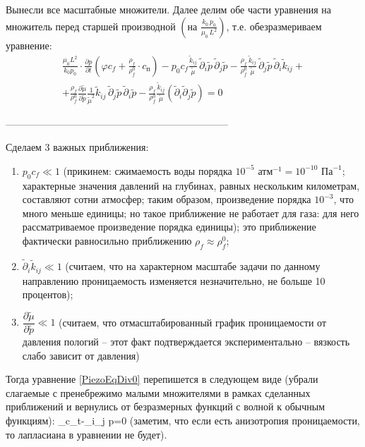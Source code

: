 Вынесли все масштабные множители. Далее делим обе части уравнения на множитель перед старшей производной $\left(\text{на }\frac{k_0\,p_0}{\mu_0\,L^2}\right)$, т.е. обезразмериваем уравнение:
\begin{multline}\label{PiezoEqDiv0}
\frac{\mu_0L^2}{k_0p_0}\cdot\frac{\partial p}{\partial t}\left(\varphi c_f+\frac{\rho_f}{\rho_f^0}\cdot c_\text{п}\right)-p_0c_f\frac{\tilde{k}_{ij}}{\tilde{\mu}}\,\tilde{\partial}_i\tilde{p}\,\tilde{\partial}_j\tilde{p}-\frac{\rho_f}{\rho_f^0}\frac{\tilde{k}_{ij}}{\tilde{\mu}}\,\tilde{\partial}_j\tilde{p}\,\tilde{\partial}_i\tilde{k}_{ij}+\\+\frac{\rho_f}{\rho_f^0}\frac{\partial\tilde{\mu}}{\partial\tilde{p}}\frac{1}{\tilde{\mu}^2}\tilde{k}_{ij}\,\tilde{\partial}_j\tilde{p}\,\tilde{\partial}_i\tilde{p}-\frac{\rho_f}{\rho_f^0}\frac{\tilde{k}_{ij}}{\tilde{\mu}}\left(\tilde{\partial}_i\tilde{\partial}_j\tilde{p}\right)=0
\end{multline}

--------------------------------------------------------------------

Сделаем 3 важных приближения:
\begin{enumerate}
	\item $p_0 c_f\ll 1$ (прикинем: сжимаемость воды порядка $10^{-5}\text{ атм}^{-1}=10^{-10}\text{ Па}^{-1}$; характерные значения давлений на глубинах, равных нескольким километрам, составляют сотни атмосфер; таким образом, произведение порядка $10^{-3}$, что много меньше единицы; но такое приближение не работает для газа: для него рассматриваемое произведение порядка единицы); это приближение фактически равносильно приближению $\rho_f\approx\rho_f^0$;
	\item $\tilde{\partial}_i\tilde{k}_{ij}\ll 1$ (считаем, что на характерном масштабе задачи по данному направлению проницаемость изменяется незначительно, не больше 10 процентов);
	\item $\dfrac{\partial\tilde{\mu}}{\partial\tilde{p}}\ll 1$ (считаем, что отмасштабированный график проницаемости от давления пологий -- этот факт подтверждается экспериментально -- вязкость слабо зависит от давления)
\end{enumerate}

Тогда уравнение \eqref{PiezoEqDiv0} перепишется в следующем виде (убрали слагаемые с пренебрежимо малыми множителями в рамках сделанных приближений и вернулись от безразмерных функций с волной к обычным функциям):
\beq
{}_{c_t}-\partial_i\partial_j p=0
\eeq
(заметим, что если есть анизотропия проницаемости, то лапласиана в уравнении не будет).

